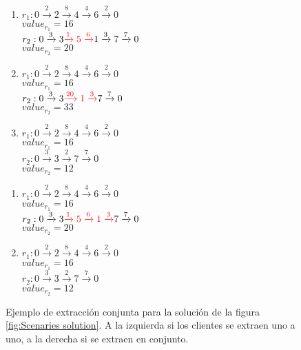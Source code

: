 \documentclass[12pt]{report}
\begin{document}
	\begin{figure}[!h]
		\begin{minipage}{0.45\textwidth}
			\begin{enumerate}
				\item
				$r_1:0 \xrightarrow{2} 2 \xrightarrow{8} 4 \xrightarrow{4} 6 \xrightarrow{2} 0$\\
				$value_{r_1} = 16$\\
				$r_2:0 \xrightarrow{3} 3 \textcolor{red}{\xrightarrow{1} 5 \xrightarrow{6}} 1 \xrightarrow{3} 7 \xrightarrow{7} 0$\\
				$value_{r_2} = 20$\\
				\item
				$r_1:0 \xrightarrow{2} 2 \xrightarrow{8} 4 \xrightarrow{4} 6 \xrightarrow{2} 0$ \\
				$value_{r_1} = 16$\\
				$r_2:0 \xrightarrow{3} 3 \textcolor{red}{\xrightarrow{20} 1 \xrightarrow{3}} 7 \xrightarrow{7} 0$ \\
				$value_{r_2} = 33$\\
				\item
				$r_1:0 \xrightarrow{2} 2 \xrightarrow{8} 4 \xrightarrow{4} 6 \xrightarrow{2} 0$ \\
				$value_{r_1} = 16$\\
				$r_2:0 \xrightarrow{3} 3 \xrightarrow{2} 7 \xrightarrow{7} 0$ \\
				$value_{r_2} = 12$\\
			\end{enumerate}
		\end{minipage}
		\hfill
		\begin{minipage}{0.45\textwidth}
			\begin{enumerate}
				\item
				$r_1:0 \xrightarrow{2} 2 \xrightarrow{8} 4 \xrightarrow{4} 6 \xrightarrow{2} 0$\\
				$value_{r_1} = 16$\\
				$r_2:0 \xrightarrow{3} 3 \textcolor{red}{\xrightarrow{1} 5 \xrightarrow{6} 1 \xrightarrow{3}} 7 \xrightarrow{7} 0$\\
				$value_{r_2} = 20$\\
				\item
				$r_1:0 \xrightarrow{2} 2 \xrightarrow{8} 4 \xrightarrow{4} 6 \xrightarrow{2} 0$ \\
				$value_{r_1} = 16$\\
				$r_2:0 \xrightarrow{3} 3 \xrightarrow{2} 7 \xrightarrow{7} 0$ \\
				$value_{r_2} = 12$\\
			\end{enumerate}
		\end{minipage}
		\caption{Ejemplo de extracción conjunta para la solución de la figura \ref{fig:Scenaries solution}. A la izquierda si los clientes se extraen uno a uno, a la derecha si se extraen en conjunto.}
		\label{fig:extract_together}
    \end{figure}
\end{document}
